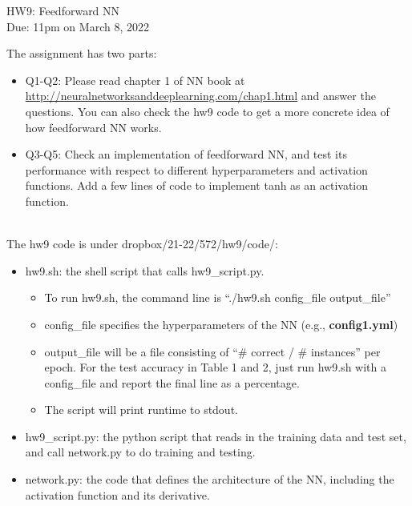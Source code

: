 \documentclass[11pt]{article}
\begin{document}
\begin{center}
\LARGE
HW9: Feedforward NN\\
Due: 11pm on March 8, 2022\\
\vspace{0.3in}
\end{center}


The assignment has two parts:
\begin{itemize}
    \item Q1-Q2: Please read chapter 1 of NN book at 
      \url{http://neuralnetworksanddeeplearning.com/chap1.html}
      and answer the questions. You can also check the hw9 code
      to get a more concrete idea of how feedforward NN works.
      
    \item Q3-Q5: Check an implementation of feedforward NN,
      and test its performance with respect to different hyperparameters
      and activation functions. Add a few lines of code to
      implement tanh as an activation function. \\ \\
\end{itemize}


The hw9 code is under dropbox/21-22/572/hw9/code/:
\begin{itemize}
\item hw9.sh: the shell script that calls hw9\_script.py.
  \begin{itemize}
    \item To run hw9.sh, the command line is ``./hw9.sh config\_file output\_file''
    \item config\_file specifies the hyperparameters of the NN
      (e.g., {\bf config1.yml})
      
    \item output\_file will be a file consisting of ``\# correct / \# instances'' per epoch. For the test accuracy in Table 1 and 2,
      just run hw9.sh with a config\_file and
      report the final line as a percentage.
      
    \item The script will print runtime to stdout. 
  \end{itemize}
  
  \item hw9\_script.py: the python script that reads in the training data and test set, and call network.py to do training and testing.

  \item network.py: the code that defines the architecture of the NN,
         including the activation function and its derivative. 
\end{itemize}
\end{document}
